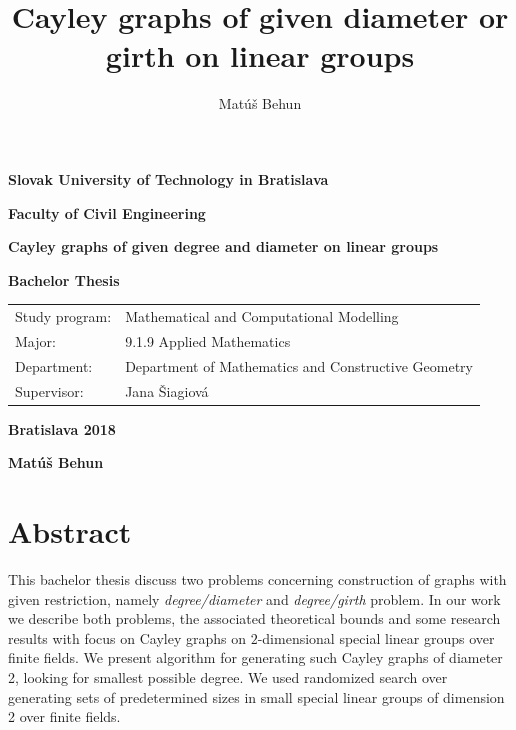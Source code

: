 \documentclass[a4paper,12pt,oneside]{report}%
\author{Mat\'u\v{s} Behun}
\title{Cayley graphs of given diameter or girth on linear groups}
\begin{document}
\setlength{\belowdisplayskip}{7pt} \setlength{\belowdisplayshortskip}{5pt}
\setlength{\abovedisplayskip}{7pt} \setlength{\abovedisplayshortskip}{5pt}


\thispagestyle{empty}
{
     \topmargin=0pt
     \centerline {\large \bf{Slovak University of Technology in Bratislava}}
     \vskip 0.2cm
     \centerline{\large \bf{Faculty of Civil Engineering}}
     \vskip 5cm
     \centerline{\Large \bf{Cayley graphs of given degree and diameter on linear groups}}
     \vskip 0.2cm
     \vskip 0.5cm
     \centerline{\large \bf{Bachelor Thesis}}
     \vskip 5cm          %
     \normalsize
         \begin{tabular}[l]{p{}p{}}
			 Study program: & Mathematical and Computational Modelling  \\
			 Major: & 9.1.9 Applied Mathematics  \\
         	 Department: & Department of Mathematics and Constructive Geometry\\
			 Supervisor: & Jana \v{S}iagiov\'a \\
         \end{tabular}
     \vskip 3cm
     \centerline{\large \bf{Bratislava 2018}}
     \vskip 0.2cm
	 \centerline{\large \bf{Mat\'u\v{s} Behun}}
}

 \newpage


\section{Abstract}

This bachelor thesis discuss two problems concerning construction of graphs with given restriction, namely {\em degree/diameter} and {\em degree/girth} problem. In our work we describe both problems, the associated theoretical bounds and some research results with focus on Cayley graphs on $2$-dimensional special linear groups over finite fields. We present algorithm for generating such Cayley graphs of diameter 2, looking for smallest possible degree. We used randomized search over generating sets of predetermined sizes in small special linear groups of dimension 2 over finite fields. ~ \\
\end{document}
